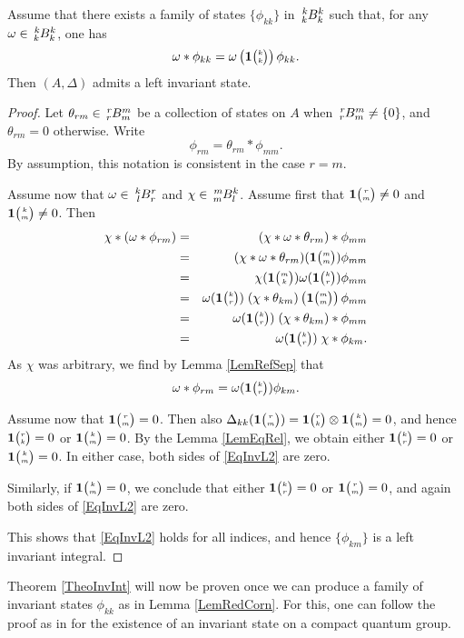 \begin{Lem}\label{LemRedCorn} Assume that there exists a family of states $\{\phi_{kk}\}$ in $\Gr{B}{k}{k}{k}{k}$ such that, for any $\omega \in \Gr{B}{k}{k}{k}{k}$, one has \[\omega*\phi_{kk} = \omega\left(\mathbf{1}{\tiny {\begin{pmatrix} k\\k\end{pmatrix}}}\right)\phi_{kk}.\] Then $(A,\Delta)$ admits a left invariant state.
\end{Lem}
\begin{proof} Let $\theta_{rm}\in \Gr{B}{r}{m}{r}{m}$ be a collection of states on $A$ when $\Gr{B}{r}{m}{r}{m}\neq \{0\}$, and $\theta_{rm}=0$ otherwise. Write \[\phi_{rm} = \theta_{rm}*\phi_{mm}.\] By assumption, this notation is consistent in the case $r=m$. 

Assume now that $\omega \in \Gr{B}{k}{r}{l}{r}$ and $\chi \in \Gr{B}{m}{k}{m}{l}$. Assume first that $\mathbf{1}{\tiny {\begin{pmatrix} r\\m\end{pmatrix}}}\neq 0$ and $\mathbf{1}{\tiny {\begin{pmatrix} k\\m\end{pmatrix}}}\neq 0$. Then \begin{eqnarray*} \chi*(\omega*\phi_{rm}) &=& (\chi*\omega*\theta_{rm})*\phi_{mm} \\ &=&  (\chi*\omega*\theta_{rm})(\mathbf{1}{\tiny {\begin{pmatrix} m\\m\end{pmatrix}}}) \phi_{mm} \\ &=&  \chi(\mathbf{1}{\tiny {\begin{pmatrix} m\\k\end{pmatrix}}})\omega(\mathbf{1}{\tiny {\begin{pmatrix} k\\r\end{pmatrix}}})\phi_{mm} \\ &=&  \omega(\mathbf{1}{\tiny {\begin{pmatrix} k\\r\end{pmatrix}}}) \; (\chi*\theta_{km})\left(\mathbf{1}{\tiny {\begin{pmatrix} m\\m\end{pmatrix}}}\right)\phi_{mm}
\\ &=& \omega(\mathbf{1}{\tiny {\begin{pmatrix} k\\r\end{pmatrix}}}) \; (\chi*\theta_{km})*\phi_{mm} \\ &=&  \omega(\mathbf{1}{\tiny {\begin{pmatrix} k\\r\end{pmatrix}}}) \; \chi*\phi_{km} .\end{eqnarray*} As $\chi$ was arbitrary, we find by Lemma \ref{LemRefSep} that \begin{equation}\label{EqInvL2} \omega*\phi_{rm} =  \omega(\mathbf{1}{\tiny {\begin{pmatrix} k\\r\end{pmatrix}}}) \phi_{km}.\end{equation}

Assume now that $\mathbf{1}{\tiny {\begin{pmatrix} r\\m\end{pmatrix}}}=0$. Then also $\Delta_{kk}(\mathbf{1}{\tiny {\begin{pmatrix} r\\m\end{pmatrix}}}) = \mathbf{1}{\tiny {\begin{pmatrix} r\\k\end{pmatrix}}}\otimes \mathbf{1}{\tiny {\begin{pmatrix} k\\m\end{pmatrix}}}=0$, and hence $\mathbf{1}{\tiny {\begin{pmatrix} r\\k\end{pmatrix}}}=0$ or $\mathbf{1}{\tiny {\begin{pmatrix} k\\m\end{pmatrix}}}=0$. By the Lemma \ref{LemEqRel}, we obtain either $\mathbf{1}{\tiny {\begin{pmatrix} k\\r\end{pmatrix}}}=0$ or $\mathbf{1}{\tiny {\begin{pmatrix} k\\m\end{pmatrix}}}=0$. In either case, both sides of \eqref{EqInvL2} are zero. 

Similarly, if $\mathbf{1}{\tiny {\begin{pmatrix} k\\m\end{pmatrix}}}=0$, we conclude that either $\mathbf{1}{\tiny {\begin{pmatrix} k\\r\end{pmatrix}}}=0$ or $\mathbf{1}{\tiny {\begin{pmatrix} r\\m\end{pmatrix}}}=0$, and again both sides of \eqref{EqInvL2} are zero.

This shows that \eqref{EqInvL2} holds for all indices, and hence $\{\phi_{km}\}$ is a left invariant integral. 
\end{proof} 

Theorem \ref{TheoInvInt} will now be proven once we can produce a family of invariant states $\phi_{kk}$ as in Lemma \ref{LemRedCorn}. For this, one can follow the proof as in \cite{MVD1} for the existence of an invariant state on a compact quantum group.


